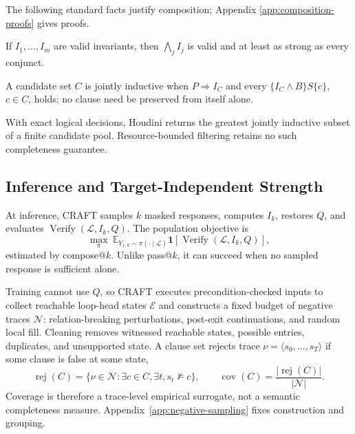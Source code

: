 The following standard facts justify composition; Appendix
\ref{app:composition-proofs} gives proofs.
\begin{proposition}\label{prop:conjunctive-closure}
If \(I_1,\ldots,I_m\) are valid invariants, then \(\bigwedge_j I_j\) is valid
and at least as strong as every conjunct.
\end{proposition}
\begin{proposition}\label{prop:mutual-support}
A candidate set \(C\) is jointly inductive when
\(P\Rightarrow I_C\) and every \(\{I_C\wedge B\}S\{c\}\), \(c\in C\), holds;
no clause need be preserved from itself alone.
\end{proposition}
\begin{theorem}
\label{thm:houdini-greatest}
With exact logical decisions, Houdini returns the greatest jointly inductive
subset of a finite candidate pool.  Resource-bounded filtering retains no
such completeness guarantee.
\end{theorem}

\subsection{Inference and Target-Independent Strength}
\label{sec:method:inference}
\label{sec:method:sampler}

At inference, CRAFT samples \(k\) masked responses, computes \(I_k\), restores
\(Q\), and evaluates \(\operatorname{Verify}(\mathcal L,I_k,Q)\).  The
population objective is
\[
 \max_\pi\ \mathbb E_{Y_{1:k}\sim\pi(\cdot\mid\mathcal L)}
 \mathbf 1[\operatorname{Verify}(\mathcal L,I_k,Q)],
\]
estimated by compose@\(k\).  Unlike pass@\(k\), it can succeed when no sampled
response is sufficient alone.

Training cannot use \(Q\), so CRAFT executes precondition-checked inputs to
collect reachable loop-head states \(\mathcal E\) and constructs a fixed
budget of negative traces \(\mathcal N\): relation-breaking perturbations,
post-exit continuations, and random local fill.  Cleaning removes witnessed
reachable states, possible entries, duplicates, and unsupported state.  A
clause set rejects trace \(\nu=\langle s_0,\ldots,s_T\rangle\) if some clause
is false at some state,
\[
 \operatorname{rej}(C)=\{\nu\in\mathcal N:\exists c\in C,\exists t,
 s_t\not\models c\},\qquad
 \operatorname{cov}(C)=\frac{|\operatorname{rej}(C)|}{|\mathcal N|}.
\]
Coverage is therefore a trace-level empirical surrogate, not a semantic
completeness measure.  Appendix~\ref{app:negative-sampling} fixes construction
and grouping.

